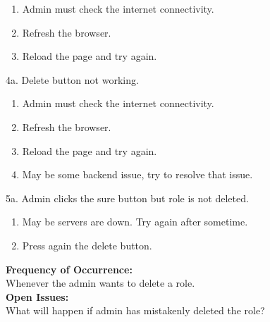 \documentclass[12pt]{article}
\begin{document}
\begin{enumerate}
\item Admin must check the internet connectivity.
\item Refresh the browser.
\item Reload the page and try again.
\end{enumerate}
4a. Delete button not working.
\begin{enumerate}
\item Admin must check the internet connectivity.
\item Refresh the browser.
\item Reload the page and try again.
\item May be some backend issue, try to resolve that issue.
\end{enumerate}
5a. Admin clicks the sure button but role is not deleted.
\begin{enumerate}
\item May be servers are down. Try again after sometime.
\item Press again the delete button.
\end{enumerate}
\textbf{Frequency of Occurrence:}\\
Whenever the admin wants to delete a role.\\
\textbf{Open Issues:}\\
What will happen if admin has mistakenly deleted the role?
\end{document}

